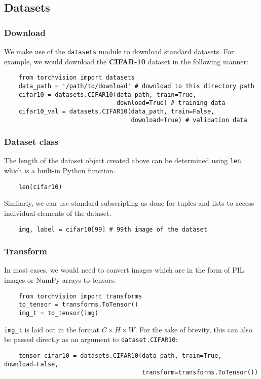 \documentclass[11pt]{article}
\begin{document}
\subsection{Datasets}
\label{sec:org25f085a}
\subsubsection{Download}
\label{sec:org5ed747b}
We make use of the \texttt{datasets} module to download standard datasets. For example, we would download the \textbf{CIFAR-10} dataset in the following manner:
\begin{verbatim}
    from torchvision import datasets
    data_path = '/path/to/download' # download to this directory path
    cifar10 = datasets.CIFAR10(data_path, train=True,
                               download=True) # training data
    cifar10_val = datasets.CIFAR10(data_path, train=False,
                                   download=True) # validation data
\end{verbatim}

\subsubsection{Dataset class}
\label{sec:orgd1e1e9c}
The length of the dataset object created above can be determined using \texttt{len}, which is a built-in Python function.
\begin{verbatim}
    len(cifar10)
\end{verbatim}
Similarly, we can use standard subscripting as done for tuples and lists to access individual elements of the dataset.
\begin{verbatim}
    img, label = cifar10[99] # 99th image of the dataset
\end{verbatim}

\subsubsection{Transform}
\label{sec:org1f819d6}
In most cases, we would need to convert images which are in the form of PIL images or NumPy arrays to tensors.
\begin{verbatim}
    from torchvision import transforms
    to_tensor = transforms.ToTensor()
    img_t = to_tensor(img)
\end{verbatim}
\texttt{img\_t} is laid out in the format \(C\times H\times W\). For the sake of brevity, this can also be passed directly as an argument to \texttt{dataset.CIFAR10}:
\begin{verbatim}
    tensor_cifar10 = datasets.CIFAR10(data_path, train=True, download=False,
                                      transform=transforms.ToTensor())
\end{verbatim}
\end{document}
